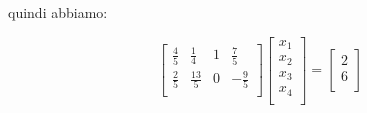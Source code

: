 \begin{enumerate}
		quindi abbiamo:
		
		$$
		\left[ {\begin{array}{cccc}
			\frac{4}{5} & \frac{1}{4} & 1 & \frac{7}{5} \\
			\frac{2}{5} & \frac{13}{5} & 0 & -\frac{9}{5} \\
		\end{array} } \right]
		\left[ {\begin{array}{c}
			x_1 \\
			x_2 \\
			x_3 \\
			x_4 \\
		\end{array} } \right]
		=
		\left[ {\begin{array}{c}
			2 \\
			6 \\
		\end{array} } \right]
		$$
	
\end{enumerate}

